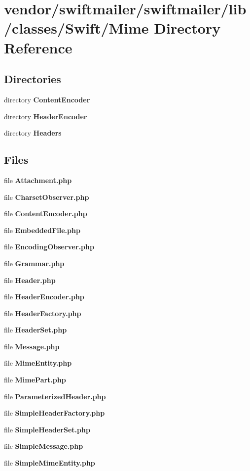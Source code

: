 \section{vendor/swiftmailer/swiftmailer/lib/classes/\+Swift/\+Mime Directory Reference}
\label{dir_2d814dc5f9f124a884d186cda39bdbb6}
\subsection*{Directories}
\begin{DoxyCompactItemize}
\item 
directory {\bf Content\+Encoder}
\item 
directory {\bf Header\+Encoder}
\item 
directory {\bf Headers}
\end{DoxyCompactItemize}
\subsection*{Files}
\begin{DoxyCompactItemize}
\item 
file {\bf Attachment.\+php}
\item 
file {\bf Charset\+Observer.\+php}
\item 
file {\bf Content\+Encoder.\+php}
\item 
file {\bf Embedded\+File.\+php}
\item 
file {\bf Encoding\+Observer.\+php}
\item 
file {\bf Grammar.\+php}
\item 
file {\bf Header.\+php}
\item 
file {\bf Header\+Encoder.\+php}
\item 
file {\bf Header\+Factory.\+php}
\item 
file {\bf Header\+Set.\+php}
\item 
file {\bf Message.\+php}
\item 
file {\bf Mime\+Entity.\+php}
\item 
file {\bf Mime\+Part.\+php}
\item 
file {\bf Parameterized\+Header.\+php}
\item 
file {\bf Simple\+Header\+Factory.\+php}
\item 
file {\bf Simple\+Header\+Set.\+php}
\item 
file {\bf Simple\+Message.\+php}
\item 
file {\bf Simple\+Mime\+Entity.\+php}
\end{DoxyCompactItemize}
